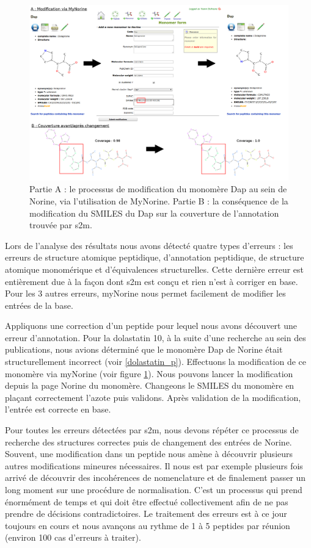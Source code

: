 \begin{figure}[h!]
  \begin{center}
    \includegraphics[width=450px]{Figures/contributions/dap_modif.png}
    \caption{\label{dap_modif}Partie A : le processus de modification du monomère Dap au sein de Norine, via l'utilisation de MyNorine.
    Partie B : la conséquence de la modification du SMILES du Dap sur la couverture de l'annotation trouvée par s2m.}
  \end{center}
\end{figure}

Lors de l'analyse des résultats nous avons détecté quatre types d'erreurs : les erreurs de structure atomique peptidique, d'annotation peptidique, de structure atomique monomérique et d'équivalences structurelles.
Cette dernière erreur est entièrement due à la façon dont s2m est conçu et rien n'est à corriger en base.
Pour les 3 autres erreurs, myNorine nous permet facilement de modifier les entrées de la base.

Appliquons une correction d'un peptide pour lequel nous avons découvert une erreur d'annotation.
Pour la dolastatin 10, à la suite d'une recherche au sein des publications, nous avions déterminé que le monomère Dap de Norine était structurellement incorrect (voir \ref{dolastatin_p}).
Effectuons la modification de ce monomère via myNorine (voir figure \ref{dap_modif}).
Nous pouvons lancer la modification depuis la page Norine du monomère.
Changeons le SMILES du monomère en plaçant correctement l'azote puis validons.
Après validation de la modification, l'entrée est correcte en base.

Pour toutes les erreurs détectées par s2m, nous devons répéter ce processus de recherche des structures correctes puis de changement des entrées de Norine.
Souvent, une modification dans un peptide nous amène à découvrir plusieurs autres modifications mineures nécessaires.
Il nous est par exemple plusieurs fois arrivé de découvrir des incohérences de nomenclature et de finalement passer un long moment sur une procédure de normalisation.
C'est un processus qui prend énormément de temps et qui doit être effectué collectivement afin de ne pas prendre de décisions contradictoires.
Le traitement des erreurs est à ce jour toujours en cours et nous avançons au rythme de 1 à 5 peptides par réunion (environ 100 cas d'erreurs à traiter).


